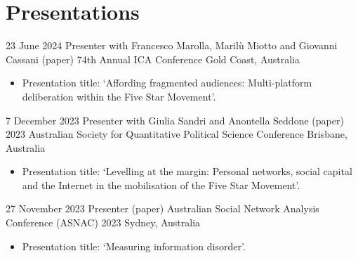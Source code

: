 \documentclass[11pt,a4paper,sans]{moderncv}
\begin{document}














\section{Presentations}

\cventry 
{23 June 2024}
{Presenter with Francesco Marolla, Marilù Miotto and Giovanni Cassani (paper)}
{74th Annual ICA Conference}
{Gold Coast, Australia}
{}
      {
      \begin{itemize} %
        \item {Presentation title: `Affording fragmented audiences: Multi-platform deliberation within the Five Star Movement'.}
      \end{itemize}
    }

\cventry 
{7 December 2023}
{Presenter with Giulia Sandri and Anontella Seddone (paper)}
{2023 Australian Society for Quantitative Political Science Conference}
{Brisbane, Australia}
{}
      {
      \begin{itemize} %
        \item {Presentation title: `Levelling at the margin: Personal networks, social capital and the Internet in the mobilisation of the Five Star Movement'.}
      \end{itemize}
    }


\cventry 
{27 November 2023}
{Presenter (paper)}
{Australian Social Network Analysis Conference (ASNAC) 2023}
{Sydney, Australia}
{}
      {
      \begin{itemize} %
        \item {Presentation title: `Measuring information disorder'.}
      \end{itemize}
    }
\end{document}
